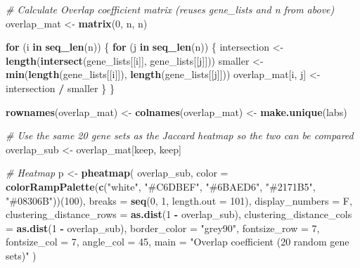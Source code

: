 \documentclass[
]{book}
\newenvironment{Shaded}{\begin{snugshade}}{\end{snugshade}}
\newcommand{\AttributeTok}[1]{\textcolor[rgb]{0.13,0.29,0.53}{#1}}
\newcommand{\CommentTok}[1]{\textcolor[rgb]{0.56,0.35,0.01}{\textit{#1}}}
\newcommand{\ControlFlowTok}[1]{\textcolor[rgb]{0.13,0.29,0.53}{\textbf{#1}}}
\newcommand{\DecValTok}[1]{\textcolor[rgb]{0.00,0.00,0.81}{#1}}
\newcommand{\FunctionTok}[1]{\textcolor[rgb]{0.13,0.29,0.53}{\textbf{#1}}}
\newcommand{\NormalTok}[1]{#1}
\newcommand{\OtherTok}[1]{\textcolor[rgb]{0.56,0.35,0.01}{#1}}
\newcommand{\SpecialCharTok}[1]{\textcolor[rgb]{0.81,0.36,0.00}{\textbf{#1}}}
\newcommand{\StringTok}[1]{\textcolor[rgb]{0.31,0.60,0.02}{#1}}
\begin{document}
\begin{Shaded}
\begin{Highlighting}[]
\CommentTok{\# Calculate Overlap coefficient matrix (reuses gene\_lists and n from above)}
\NormalTok{overlap\_mat }\OtherTok{\textless{}{-}} \FunctionTok{matrix}\NormalTok{(}\DecValTok{0}\NormalTok{, n, n)}

\ControlFlowTok{for}\NormalTok{ (i }\ControlFlowTok{in} \FunctionTok{seq\_len}\NormalTok{(n)) \{}
  \ControlFlowTok{for}\NormalTok{ (j }\ControlFlowTok{in} \FunctionTok{seq\_len}\NormalTok{(n)) \{}
\NormalTok{    intersection }\OtherTok{\textless{}{-}} \FunctionTok{length}\NormalTok{(}\FunctionTok{intersect}\NormalTok{(gene\_lists[[i]], gene\_lists[[j]]))}
\NormalTok{    smaller      }\OtherTok{\textless{}{-}} \FunctionTok{min}\NormalTok{(}\FunctionTok{length}\NormalTok{(gene\_lists[[i]]), }\FunctionTok{length}\NormalTok{(gene\_lists[[j]]))}
\NormalTok{    overlap\_mat[i, j] }\OtherTok{\textless{}{-}}\NormalTok{ intersection }\SpecialCharTok{/}\NormalTok{ smaller}
\NormalTok{  \}}
\NormalTok{\}}

\FunctionTok{rownames}\NormalTok{(overlap\_mat) }\OtherTok{\textless{}{-}} \FunctionTok{colnames}\NormalTok{(overlap\_mat) }\OtherTok{\textless{}{-}} \FunctionTok{make.unique}\NormalTok{(labs)}

\CommentTok{\# Use the same 20 gene sets as the Jaccard heatmap so the two can be compared}
\NormalTok{overlap\_sub }\OtherTok{\textless{}{-}}\NormalTok{ overlap\_mat[keep, keep]}


\CommentTok{\# Heatmap}
\NormalTok{p }\OtherTok{\textless{}{-}} \FunctionTok{pheatmap}\NormalTok{(}
\NormalTok{  overlap\_sub,}
  \AttributeTok{color           =} \FunctionTok{colorRampPalette}\NormalTok{(}\FunctionTok{c}\NormalTok{(}\StringTok{"white"}\NormalTok{, }\StringTok{"\#C6DBEF"}\NormalTok{, }\StringTok{"\#6BAED6"}\NormalTok{, }\StringTok{"\#2171B5"}\NormalTok{, }\StringTok{"\#08306B"}\NormalTok{))(}\DecValTok{100}\NormalTok{),}
  \AttributeTok{breaks          =} \FunctionTok{seq}\NormalTok{(}\DecValTok{0}\NormalTok{, }\DecValTok{1}\NormalTok{, }\AttributeTok{length.out =} \DecValTok{101}\NormalTok{),}
  \AttributeTok{display\_numbers =}\NormalTok{ F,}
  \AttributeTok{clustering\_distance\_rows =} \FunctionTok{as.dist}\NormalTok{(}\DecValTok{1} \SpecialCharTok{{-}}\NormalTok{ overlap\_sub),}
  \AttributeTok{clustering\_distance\_cols =} \FunctionTok{as.dist}\NormalTok{(}\DecValTok{1} \SpecialCharTok{{-}}\NormalTok{ overlap\_sub),}
  \AttributeTok{border\_color    =} \StringTok{"grey90"}\NormalTok{,}
  \AttributeTok{fontsize\_row    =} \DecValTok{7}\NormalTok{,}
  \AttributeTok{fontsize\_col    =} \DecValTok{7}\NormalTok{,}
  \AttributeTok{angle\_col       =} \DecValTok{45}\NormalTok{,}
  \AttributeTok{main            =} \StringTok{"Overlap coefficient (20 random gene sets)"}
\NormalTok{)}
\end{Highlighting}
\end{Shaded}
\end{document}
